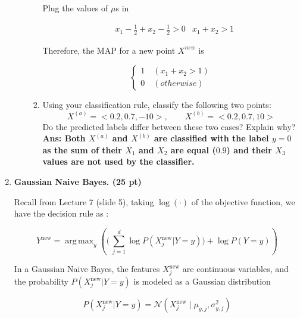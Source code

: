 \documentclass{article}
\DeclareMathOperator*{\argmax}{arg\,max}
\theoremstyle{definition}
\theoremstyle{remark}
\newenvironment{Q}
        {%
          \clearpage
          \item
        }
        {%
          \phantom{s} %
          \bigskip
        }
\begin{document}
\begin{enumerate}[font={\Large\bfseries},left=0pt]
\begin{tcolorbox}
\begin{enumerate}
\begin{enumerate}
				            Plug the values of $\mu$s in

				            \begin{align}
					             & x_1 - \tfrac12 + x_2 - \tfrac12 > 0
					             & x_1 + x_2 > 1
				            \end{align}

				            Therefore, the MAP for a new point $X^{new}$ is

				            $$
					            \begin{cases}
						            1 \quad (x_1 + x_2 > 1) \\
						            0 \quad(otherwise)
					            \end{cases}
				            $$


				      \item Using your classification rule, classify the following two points:
				            $$
					            X^{(a)} = <0.2, 0.7, -10>, \quad\quad X^{(b)} = <0.2, 0.7, 10>
				            $$
				            Do the predicted labels differ between these two cases? Explain why? \\
				            \textbf{Ans: Both $X^{(a)}$ and $X^{(b)}$ are classified with the label $y = 0$ as the sum of their $X_1$ and $X_2$ are equal ($0.9$) and their $X_3$ values are not used by the classifier.}

			      \end{enumerate}

		\end{enumerate}
	\end{tcolorbox}
	\begin{Q}
		\textbf{\Large  Gaussian Naive Bayes. (25 pt)}

		Recall from Lecture 7 (slide 5), taking $\log(\cdot)$ of the objective function, we have the decision rule as :

		$$
			Y^{\text{new}} = \argmax_y \left( \biggl(\, \sum_{j=1}^d \log P(X_j^{\text{new}} | Y = y) \biggr) +\log P(Y=y) \right)
		$$

		In a Gaussian Naive Bayes, the features $X^{\text{new}}_j$ are continuous variables, and the probability $P(X^{\text{new}}_j|Y=y)$ is modeled as a Gaussian distribution

		$$
			P(X^{\text{new}}_j|Y=y)= \mathcal{N}(X^{\text{new}}_j\mid\mu_{y,j},\sigma^2_{y,j})
		$$


\end{Q}
\end{enumerate}
\end{document}
